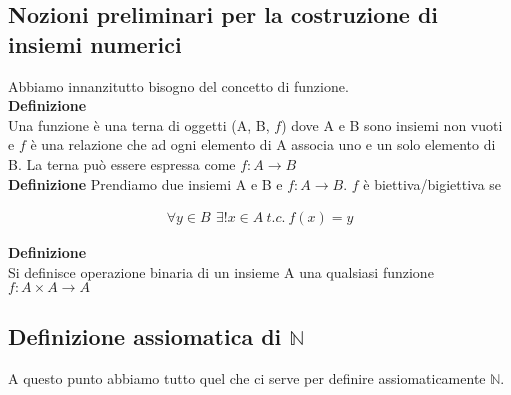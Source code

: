 \documentclass{article}
\begin{document}
\subsection{Nozioni preliminari per la costruzione di insiemi numerici}
Abbiamo innanzitutto bisogno del concetto di funzione. 
\vspace{0.2cm}\\
\textbf{Definizione} \label{1_def} \\
Una funzione è una terna di oggetti (A, B, $f$) dove A e B sono insiemi non vuoti e 
$f$ è una relazione che ad ogni elemento di A associa uno e un solo elemento di B.
La terna può essere espressa come $f : A \to B$
\vspace{0.2cm} \\
\textbf{Definizione} \label{2_def}
Prendiamo due insiemi A e B e $f : A \to B$. $f$ è biettiva/bigiettiva se  
\vspace{-1.5em}
\begin{center}
  \begin{align}
    \forall y \in B \ \, \exists! x \in A \: t.c. \: f(x) = y \label{9}
  \end{align}
\end{center}
\textbf{Definizione} \label{3_def} \\
  Si definisce operazione binaria di un insieme A una qualsiasi funzione $f : A \times
   A \to A$

\subsection{Definizione assiomatica di $\mathbb{N}$}
  A questo punto abbiamo tutto quel che ci serve per definire assiomaticamente $\mathbb{N}$.
  
\end{document}

